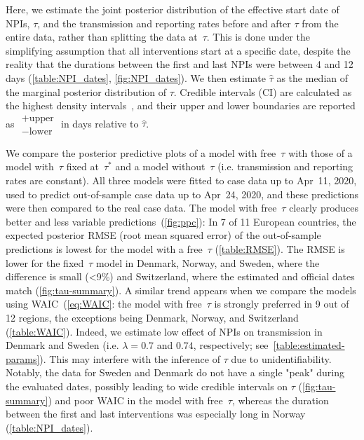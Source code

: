 \documentclass[12pt]{extarticle}
\begin{document}
Here, we estimate the joint posterior distribution of the effective start date of NPIs, $\tau$, and the transmission and reporting rates before and after $\tau$ from the entire data, rather than splitting the data at~$\tau$. 
This is done under the simplifying assumption that all interventions start at a specific date, despite the reality that the durations between the first and last NPIs were between 4 and 12 days (\autoref{table:NPI_dates}, \autoref{fig:NPI_dates}).
We then estimate $\hat{\tau}$ as the median of the marginal posterior distribution of $\tau$.
Credible intervals (CI) are calculated as the highest density intervals~\citep{Kruschke2014}, and their upper and lower boundaries are reported as $\substack{+\text{upper} \\ -\text{lower}}$ in days relative to $\hat{\tau}$.

We compare the posterior predictive plots of a model with  free~$\tau$ with those of a model with~$\tau$ fixed at~$\tau^*$ and a model without~$\tau$ (i.e. transmission and reporting rates are constant).
All three models were fitted to case data up to Apr~11, 2020, used to predict out-of-sample case data up to Apr~24, 2020, and these predictions were then compared to the real case data. 
The model with free~$\tau$ clearly produces better and less variable predictions~(\autoref{fig:ppc}):
In 7 of 11 European countries, the expected posterior RMSE (root mean squared error) of the out-of-sample predictions is lowest for the model with a free~$\tau$ (\autoref{table:RMSE}). The RMSE is lower for the fixed~$\tau$ model in Denmark, Norway, and Sweden, where the difference is small (<9\%) and Switzerland, where the estimated and official dates match (\autoref{fig:tau-summary}). 
A similar trend appears when we compare the models using WAIC~(\autoref{eq:WAIC}: the model with free~$\tau$ is strongly preferred in 9 out of 12 regions, the exceptions being Denmark, Norway, and Switzerland (\autoref{table:WAIC}).
Indeed, we estimate low effect of NPIs on transmission in Denmark and Sweden (i.e. $\lambda=0.7$ and $0.74$, respectively; see~\autoref{table:estimated-params}).
This may interfere with the inference of $\tau$ due to unidentifiability. 
Notably, the data for Sweden and Denmark do not have a single "peak" during the evaluated dates, possibly leading to wide credible intervals on $\tau$ (\autoref{fig:tau-summary}) and poor WAIC in the model with free~$\tau$, whereas the duration between the first and last interventions was especially long in Norway (\autoref{table:NPI_dates}).
\end{document}

